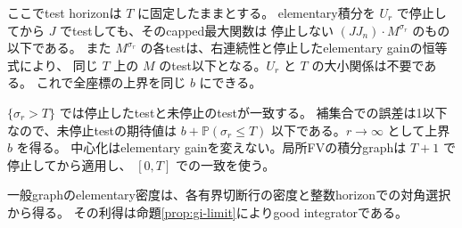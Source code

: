 ここでtest horizonは $T$ に固定したままとする。
elementary積分を $U_r$ で停止してから $J$ でtestしても、そのcapped最大関数は
停止しない $(JJ_n)\cdot M^{\sigma_r}$ のもの以下である。
また $M^{\sigma_r}$ の各testは、右連続性と停止したelementary gainの恒等式により、
同じ $T$ 上の $M$ のtest以下となる。$U_r$ と $T$ の大小関係は不要である。
これで全座標の上界を同じ $b$ にできる。

$\{\sigma_r>T\}$ では停止したtestと未停止のtestが一致する。
補集合での誤差は1以下なので、未停止testの期待値は
$b+\mathbb P(\sigma_r\leq T)$ 以下である。$r\to\infty$ として上界 $b$ を得る。
中心化はelementary gainを変えない。局所FVの積分graphは $T+1$ で停止してから適用し、
$[0,T]$ での一致を使う。



一般graphのelementary密度は、各有界切断行の密度と整数horizonでの対角選択から得る。
その利得は命題\ref{prop:gi-limit}によりgood integratorである。
